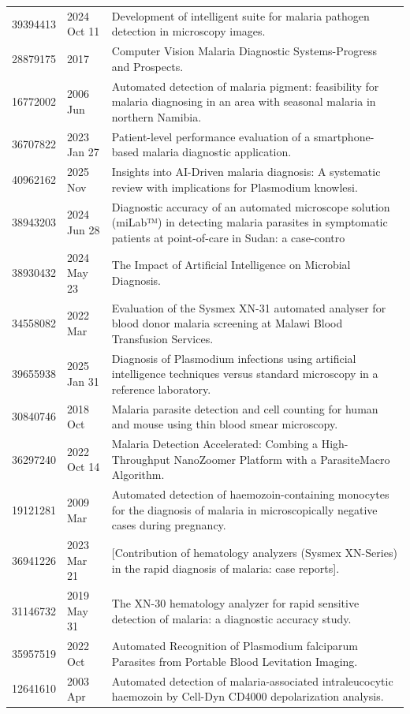 \begin{longtable}{llp{9.5cm}}
39394413 & 2024 Oct 11 & Development of intelligent suite for malaria pathogen detection in microscopy images. \\
28879175 & 2017 & Computer Vision Malaria Diagnostic Systems-Progress and Prospects. \\
16772002 & 2006 Jun & Automated detection of malaria pigment: feasibility for malaria diagnosing in an area with seasonal malaria in northern Namibia. \\
36707822 & 2023 Jan 27 & Patient-level performance evaluation of a smartphone-based malaria diagnostic application. \\
40962162 & 2025 Nov & Insights into AI-Driven malaria diagnosis: A systematic review with implications for Plasmodium knowlesi. \\
38943203 & 2024 Jun 28 & Diagnostic accuracy of an automated microscope solution (miLab™) in detecting malaria parasites in symptomatic patients at point-of-care in Sudan: a case-contro \\
38930432 & 2024 May 23 & The Impact of Artificial Intelligence on Microbial Diagnosis. \\
34558082 & 2022 Mar & Evaluation of the Sysmex XN-31 automated analyser for blood donor malaria screening at Malawi Blood Transfusion Services. \\
39655938 & 2025 Jan 31 & Diagnosis of Plasmodium infections using artificial intelligence techniques versus standard microscopy in a reference laboratory. \\
30840746 & 2018 Oct & Malaria parasite detection and cell counting for human and mouse using thin blood smear microscopy. \\
36297240 & 2022 Oct 14 & Malaria Detection Accelerated: Combing a High-Throughput NanoZoomer Platform with a ParasiteMacro Algorithm. \\
19121281 & 2009 Mar & Automated detection of haemozoin-containing monocytes for the diagnosis of malaria in microscopically negative cases during pregnancy. \\
36941226 & 2023 Mar 21 & [Contribution of hematology analyzers (Sysmex XN-Series) in the rapid diagnosis of malaria: case reports]. \\
31146732 & 2019 May 31 & The XN-30 hematology analyzer for rapid sensitive detection of malaria: a diagnostic accuracy study. \\
35957519 & 2022 Oct & Automated Recognition of Plasmodium falciparum Parasites from Portable Blood Levitation Imaging. \\
12641610 & 2003 Apr & Automated detection of malaria-associated intraleucocytic haemozoin by Cell-Dyn CD4000 depolarization analysis. \\

\end{longtable}
